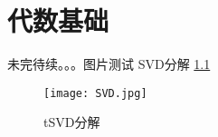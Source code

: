 \chapter{代数基础}
未完待续。。。图片测试
SVD分解 \ref{1}
\begin{figure}[htbp]
	\centering
	\texttt{[image: SVD.jpg]}
	\caption{tSVD分解}
	\label{1}
\end{figure}
